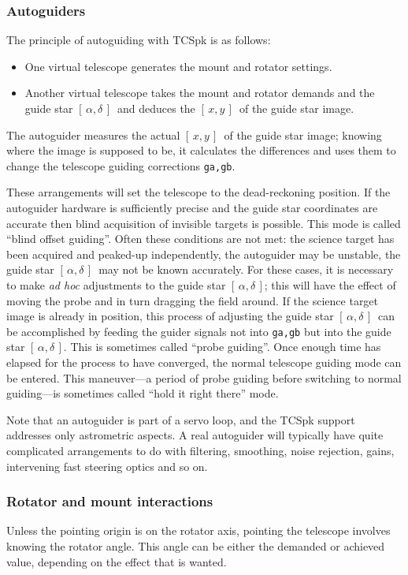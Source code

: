 \documentclass[12pt,fleqn,twoside]{article}
\renewcommand{\_}{{\tt\char'137}}     %
\newcommand{\radec}     {$[\,\alpha,\delta\,]$}
\newcommand{\xy}        {$[\,x,y\,]$}
\begin{document}
\subsubsection{Autoguiders}
The principle of autoguiding with TCSpk is as follows:
\begin{itemize}
\item One virtual telescope generates the mount and rotator
      settings.
\item Another virtual telescope takes the mount and rotator
      demands and the guide star \radec\ and deduces the
      \xy\ of the guide star image.
\end{itemize}
The autoguider measures the actual \xy\ of the guide star image;
knowing where the image is supposed to be, it calculates the
differences and uses them to change the telescope guiding
corrections {\tt ga,gb}.

These arrangements will set the telescope to the dead-reckoning
position.  If the autoguider hardware is sufficiently precise
and the guide star coordinates are accurate then blind acquisition
of invisible targets is possible.  This mode is called ``blind offset
guiding''.  Often these conditions are not met:  the science target
has been acquired and peaked-up independently, the autoguider may be
unstable, the guide star \radec\ may not be known accurately.
For these cases, it is necessary to make {\it ad hoc}\/
adjustments to the guide star \radec;  this will have the effect
of moving the probe and in turn dragging the field around.  If
the science target image is already in position, this process of
adjusting the guide star \radec\ can be accomplished by feeding the
guider signals not into {\tt ga,gb} but into the guide star \radec.
This is sometimes called ``probe guiding''.  Once enough time has
elapsed for the process to have converged, the normal
telescope guiding mode can be entered.  This
maneuver---a period of probe guiding before switching to normal
guiding---is sometimes called ``hold it right there'' mode.

Note that an autoguider is part of a servo loop, and the TCSpk
support addresses only astrometric aspects.  A real autoguider
will typically have
quite complicated arrangements to do with filtering, smoothing,
noise rejection, gains, intervening fast steering optics and so on.

\subsubsection{Rotator and mount interactions}
Unless the pointing origin is on the rotator axis,
pointing the telescope involves knowing the rotator angle.  This
angle can be either the demanded or achieved value, depending on
the effect that is wanted.
\end{document}
